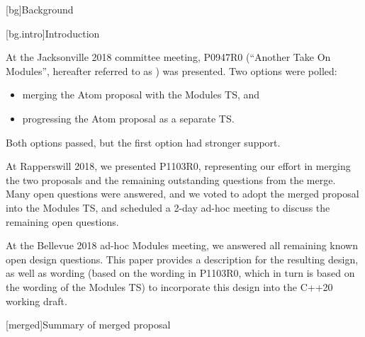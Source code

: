 \setcounter{chapter}{0}
[bg]{Background}

[bg.intro]{Introduction}

At the Jacksonville 2018 committee meeting,
P0947R0 (``Another Take On Modules'',
hereafter referred to as )
was presented. Two options were polled:

\begin{itemize}
\item merging the Atom proposal with the Modules TS, and
\item progressing the Atom proposal as a separate TS.
\end{itemize}

Both options passed, but the first option had stronger support.

At Rapperswill 2018, we presented P1103R0, representing
our effort in merging the two proposals
and the remaining outstanding questions from the merge.
Many open questions were answered, and we voted to adopt the
merged proposal into the Modules TS, and
scheduled a 2-day ad-hoc meeting to discuss the remaining
open questions.

At the Bellevue 2018 ad-hoc Modules meeting, we answered all
remaining known open design questions. This paper provides a
description for the resulting design, as well as wording
(based on the wording in P1103R0, which in turn is based on
the wording of the Modules TS) to incorporate this design
into the C++20 working draft.

%
%
%
%

[merged]{Summary of merged proposal}

